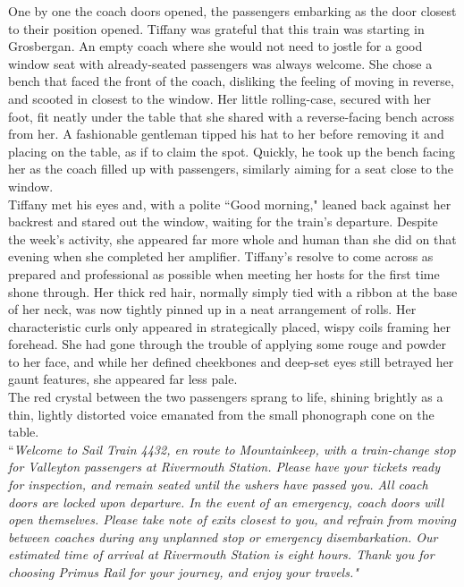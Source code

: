 One by one the coach doors opened, the passengers embarking as the door closest to their position opened.
Tiffany was grateful that this train was starting in Grosbergan. 
An empty coach where she would not need to jostle for a good window seat with already-seated passengers was always welcome.
She chose a bench that faced the front of the coach, disliking the feeling of moving in reverse, and scooted in closest to the window. 
Her little rolling-case, secured with her foot, fit neatly under the table that she shared with a reverse-facing bench across from her.
A fashionable gentleman tipped his hat to her before removing it and placing on the table, as if to claim the spot. 
Quickly, he took up the bench facing her as the coach filled up with passengers, similarly aiming for a seat close to the window.\\

Tiffany met his eyes and, with a polite ``Good morning," leaned back against her backrest and stared out the window, waiting for the train's departure.
Despite the week's activity, she appeared far more whole and human than she did on that evening when she completed her amplifier.
Tiffany's resolve to come across as prepared and professional as possible when meeting her hosts for the first time shone through.
Her thick red hair, normally simply tied with a ribbon at the base of her neck, was now tightly pinned up in a neat arrangement of rolls.
Her characteristic curls only appeared in strategically placed, wispy coils framing her forehead.
She had gone through the trouble of applying some rouge and powder to her face, and while her defined cheekbones and deep-set eyes still betrayed her gaunt features, she appeared far less pale.\\

The red crystal between the two passengers sprang to life, shining brightly as a thin, lightly distorted voice emanated from the small phonograph cone on the table.\\

``\textit{Welcome to Sail Train 4432, en route to Mountainkeep, with a train-change stop for Valleyton passengers at Rivermouth Station. Please have your tickets ready for inspection, and remain seated until the ushers have passed you. All coach doors are locked upon departure. In the event of an emergency, coach doors will open themselves. Please take note of exits closest to you, and refrain from moving between coaches during any unplanned stop or emergency disembarkation.
Our estimated time of arrival at Rivermouth Station is eight hours. 
Thank you for choosing Primus Rail for your journey, and enjoy your travels."}\\

